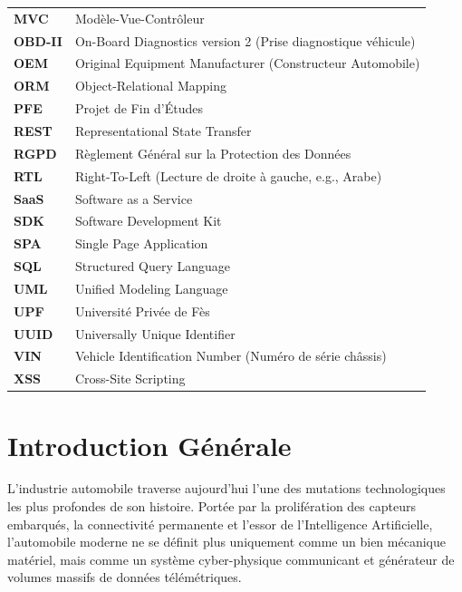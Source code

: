 \documentclass[12pt,a4paper,twoside,openright]{report}
\begin{document}
\begin{longtable}{p{} p{}}
  \textbf{MVC} & Mod\`ele-Vue-Contr\^oleur \\
  \textbf{OBD-II} & On-Board Diagnostics version 2 (Prise diagnostique v\'ehicule) \\
  \textbf{OEM} & Original Equipment Manufacturer (Constructeur Automobile) \\
  \textbf{ORM} & Object-Relational Mapping \\
  \textbf{PFE} & Projet de Fin d'\'Etudes \\
  \textbf{REST} & Representational State Transfer \\
  \textbf{RGPD} & R\`eglement G\'en\'eral sur la Protection des Donn\'ees \\
  \textbf{RTL} & Right-To-Left (Lecture de droite \`a gauche, e.g., Arabe) \\
  \textbf{SaaS} & Software as a Service \\
  \textbf{SDK} & Software Development Kit \\
  \textbf{SPA} & Single Page Application \\
  \textbf{SQL} & Structured Query Language \\
  \textbf{UML} & Unified Modeling Language \\
  \textbf{UPF} & Universit\'e Priv\'ee de F\`es \\
  \textbf{UUID} & Universally Unique Identifier \\
  \textbf{VIN} & Vehicle Identification Number (Num\'ero de s\'erie ch\^assis) \\
  \textbf{XSS} & Cross-Site Scripting \\
  \bottomrule
  \end{longtable}

  \newpage

  \setcounter{page}{1}

  \chapter*{Introduction G\'en\'erale}

  L'industrie automobile traverse aujourd'hui l'une des mutations technologiques les plus profondes de son histoire. Port\'ee par la prolif\'eration des capteurs embarqu\'es, la connectivit\'e permanente et l'essor de l'Intelligence Artificielle, l'automobile moderne ne se d\'efinit plus uniquement comme un bien m\'ecanique mat\'eriel, mais comme un syst\`eme cyber-physique communicant et g\'en\'erateur de volumes massifs de donn\'ees t\'el\'em\'etriques.
\end{document}
